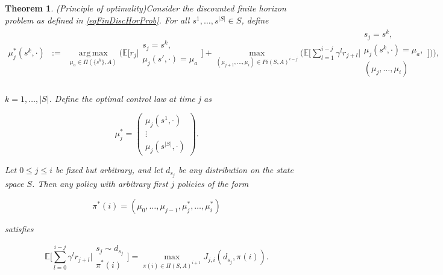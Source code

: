 \documentclass[11pt]{article} %
\newtheorem{thm}{Theorem}
\DeclareMathOperator*{\argmax}{arg\,max}
\begin{document}
\begin{thm}(Principle of optimality)\label{thmBuildingFiniteSolution}
	Consider the discounted finite horizon problem as defined in \ref{eqFinDiscHorProb}. For all $s^1,\dots,s^{|S|} \in S$, define
\begin{equation}
	\begin{array}{clll}
		\mu_j^*(s^k,\cdot)	& := 	& \argmax\limits_{\mu_a \in \Pi(\{s^k\},A)} \Big( \mathbb{E}\Big[r_j \Big| \begin{array}{c}
																							s_j = s^k, \\
																							\mu_j(s',\cdot) = \mu_a
																						\end{array} 
																							\Big] + \max\limits_{(\mu_{j+1},\dots,\mu_i) \in Pi(S,A)^{i-j}}\Big( \mathbb{E} \Big[ \sum\limits_{l=1}^{i-j}\gamma^l r_{j+l} \Big| \begin{array}{c}
															s_j = s^k, \\
															\mu_j(s^k,\cdot) = \mu_a, \\
															(\mu_j,\dots,\mu_i)
														\end{array} \Big] \Big)\Big),\\
	\end{array}
\end{equation}

$k=1,\dots,|S|$. Define the optimal control law at time j as

\begin{equation}
	\mu_j^* = 	\left(\begin{array}{c}
						\mu_j(s^1,\cdot) \\
						\vdots \\
						\mu_j(s^{|S|},\cdot)
				\end{array}\right).
\end{equation}

Let $0\le j \le i$ be fixed but arbitrary, and let $d_{s_j}$ be any distribution on the state space $S$. Then any policy with arbitrary first $j$ policies of the form

\begin{equation}
	\pi^*(i) = (\mu_0,\dots,\mu_{j-1},\mu_j^*,\dots,\mu_i^*)
\end{equation}

satisfies

\begin{equation}
	\mathbb{E}\Big[ \sum\limits_{l=0}^{i-j} \gamma^l r_{j+l} \Big| 	\begin{array}{c}
														s_j \sim d_{s_j} \\
														\pi^*(i)
													\end{array} \Big] = \max_{\pi(i) \in \Pi(S,A)^{i+1}} J_{j,i}(d_{s_j},\pi(i)). %
\end{equation}


\end{thm}
\end{document}
